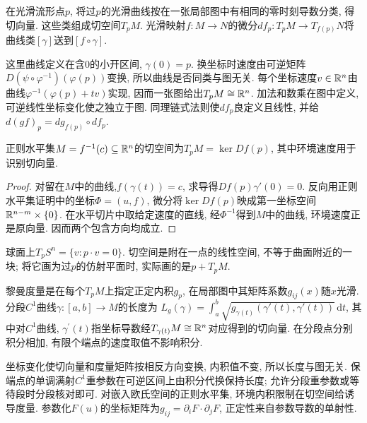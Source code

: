 \begin{definition}
在光滑流形点$p$, 将过$p$的光滑曲线按在一张局部图中有相同的零时刻导数分类, 得切向量. 这些类组成切空间$T_pM$. 光滑映射$f:M\to N$的微分$df_p:T_pM\to T_{f(p)}N$将曲线类$[\gamma]$送到$[f\circ\gamma]$.
\end{definition}
这里曲线定义在含$0$的小开区间, $\gamma(0)=p$. 换坐标时速度由可逆矩阵$D(\psi\circ\varphi^{-1})(\varphi(p))$变换, 所以曲线是否同类与图无关. 每个坐标速度$v\in\mathbb R^n$由曲线$\varphi^{-1}(\varphi(p)+tv)$实现, 因而一张图给出$T_pM\cong\mathbb R^n$. 加法和数乘在图中定义, 可逆线性坐标变化使之独立于图. 同理链式法则使$df_p$良定义且线性, 并给$d(gf)_p=dg_{f(p)}\circ df_p$.

\begin{proposition}\label{thm:tangent-level}
正则水平集$M=f^{-1}(c)\subseteq\mathbb R^n$的切空间为$T_pM=\ker Df(p)$, 其中环境速度用于识别切向量.
\end{proposition}
\begin{proof}
对留在$M$中的曲线,$f(\gamma(t))=c$, 求导得$Df(p)\gamma'(0)=0$. 反向用正则水平集证明中的坐标$\Phi=(u,f)$, 微分将$\ker Df(p)$映成第一坐标空间$\mathbb R^{n-m}\times\{0\}$. 在水平切片中取给定速度的直线, 经$\Phi^{-1}$得到$M$中的曲线, 环境速度正是原向量. 因而两个包含方向均成立.
\end{proof}
球面上$T_pS^n=\{v:p\cdot v=0\}$. 切空间是附在一点的线性空间, 不等于曲面附近的一块; 将它画为过$p$的仿射平面时, 实际画的是$p+T_pM$.

\begin{definition}
黎曼度量是在每个$T_pM$上指定正定内积$g_p$, 在局部图中其矩阵系数$g_{ij}(x)$随$x$光滑. 分段$C^1$曲线$\gamma:[a,b]\to M$的长度为
$L_g(\gamma)=\int_a^b\sqrt{g_{\gamma(t)}(\gamma'(t),\gamma'(t))}\,\mathrm dt$,
其中对$C^1$曲线, $\gamma^{\prime}(t)$指坐标导数经$T_{\gamma(t)}M\cong\mathbb R^n$对应得到的切向量. 在分段点分别积分相加, 有限个端点的速度取值不影响积分.
\end{definition}
坐标变化使切向量和度量矩阵按相反方向变换, 内积值不变, 所以长度与图无关. 保端点的单调满射$C^1$重参数在可逆区间上由积分代换保持长度; 允许分段重参数或等待段时分段核对即可. 对嵌入欧氏空间的正则水平集, 环境内积限制在切空间给诱导度量. 参数化$F(u)$的坐标矩阵为$g_{ij}=\partial_iF\cdot\partial_jF$, 正定性来自参数导数的单射性.

